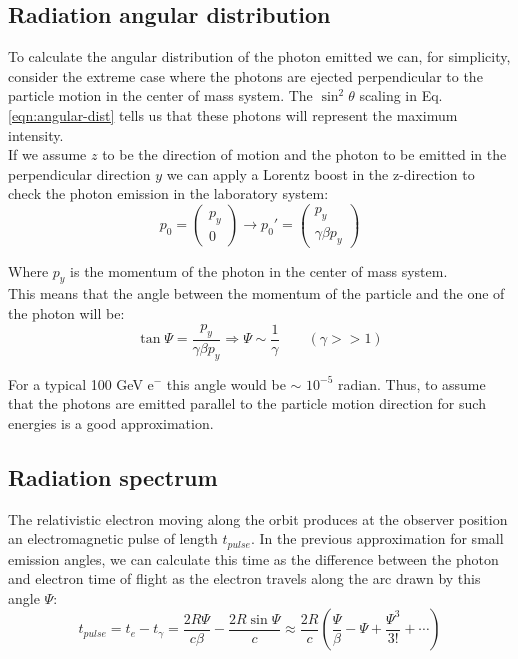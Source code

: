  \subsection{Radiation angular distribution}
 To calculate the angular distribution of the photon emitted we can, for simplicity, consider the extreme case where the photons are ejected perpendicular to the particle motion in the center of mass system. The $\sin^2 \theta $ scaling in Eq.\ref{eqn:angular-dist} tells us that these photons will represent the maximum intensity.\\
 If we assume $z$ to be the direction of motion and the photon to be emitted in the perpendicular direction $y$ we can apply a Lorentz boost in the z-direction to check the photon emission in the laboratory system:
 \[
 p_0 = 
 \begin{pmatrix}
 p_y \\ 
 0
 \end{pmatrix}
\longrightarrow
p_0'=
\begin{pmatrix}
p_y \\
\gamma \beta p_y 
\end{pmatrix}  
 \]

Where $p_y$ is the momentum of the photon in the center of mass system. \\
This means that the angle between the momentum of the particle and the one of the photon will be:
\begin{equation}
\tan \Psi = \frac{p_y}{\gamma \beta p_y} \Rightarrow \Psi \sim \frac{1}{\gamma} \qquad (\gamma >> 1)
\end{equation}

For a typical 100 GeV e$^-$ this angle would be $\sim$ $10^{-5}$ radian. Thus, to assume that the photons are emitted parallel to the particle motion direction for such energies is a good approximation.

\subsection{Radiation spectrum}
The relativistic electron moving along the orbit produces at the observer position an electromagnetic pulse of length $t_{pulse}$. In the previous approximation for small emission angles, we can calculate this time as the difference between the photon and electron time of flight as the electron travels along the arc drawn by this angle $\Psi$:
\[t_{pulse} = t_e - t_{\gamma} =  \frac{2R\Psi}{c \beta} - \frac{2 R \sin \Psi}{c}
\approx \frac{2R}{c}\left(\frac{\Psi}{\beta}-\Psi+\frac{\Psi^3}{3!}+\cdots\right)
\]

